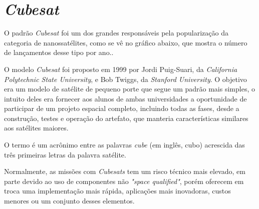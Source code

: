 \section{\textit{Cubesat}}\label{cubesat_revision}

O padrão \textit{Cubesat} foi um dos grandes responsáveis pela popularização da categoria de nanossatélites, como se vê no gráfico abaixo, que mostra o número de lançamentos desse tipo por ano.\cite{cubesats_cgee}.

\noindent
\begin{minipage}{\linewidth}
\label{cubesat_launches_fig}
\end{minipage}

O modelo \textit{Cubesat} foi proposto em 1999 por Jordi Puig-Suari, da \textit{California Polytechnic State University}, e Bob Twiggs, da \textit{Stanford University}. O objetivo era um modelo de satélite de pequeno porte que segue um padrão mais simples, o intuito deles era fornecer aos alunos de ambas universidades a oportunidade de  participar de um projeto espacial completo, incluindo todas as fases, desde a construção, testes e operação do artefato, que manteria características similares aos satélites maiores. 

O termo é um acrônimo entre as palavras \textit{cube} (em inglês, cubo) acrescida das três primeiras letras da palavra satélite.

Normalmente, as missões com \textit{Cubesats} tem um risco técnico mais elevado, em parte devido ao uso de componentes não \textit{"space qualified"}, porém oferecem em troca uma implementação mais rápida, aplicações mais inovadoras, custos menores ou um conjunto desses elementos.

